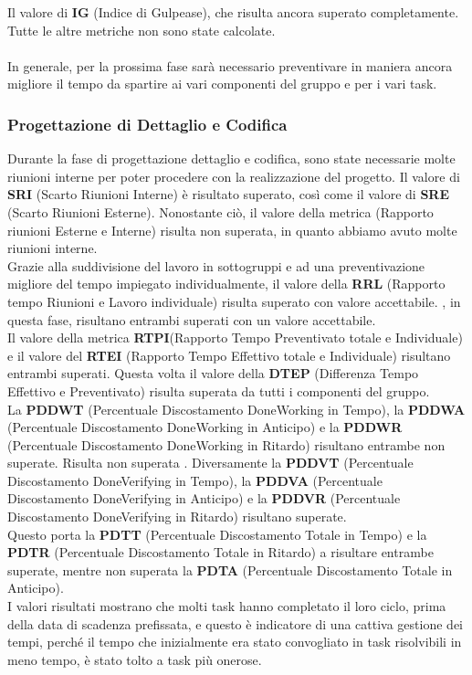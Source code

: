 Il valore di \textbf{IG} (Indice di Gulpease), che risulta ancora superato completamente.\\
Tutte le altre metriche non sono state calcolate.\\\\
In generale, per la prossima fase sarà necessario preventivare in maniera ancora migliore il tempo da spartire ai vari componenti del gruppo e per i vari task.

\subsubsection{Progettazione di Dettaglio e Codifica}
Durante la fase di progettazione dettaglio e codifica, sono state necessarie molte riunioni interne per poter procedere con la realizzazione del progetto.
Il valore di \textbf{SRI} (Scarto Riunioni Interne) è risultato superato, così come il valore di \textbf{SRE} (Scarto Riunioni Esterne). Nonostante ciò, il valore della metrica (Rapporto riunioni Esterne e Interne) risulta non superata, in quanto abbiamo avuto molte riunioni interne.\\
Grazie alla suddivisione del lavoro in sottogruppi e ad una preventivazione migliore del tempo impiegato individualmente, il valore della \textbf{RRL} (Rapporto tempo Riunioni e Lavoro individuale) risulta superato con valore accettabile. , in questa fase, risultano entrambi superati con un valore accettabile. \\
Il valore della metrica \textbf{RTPI}(Rapporto Tempo Preventivato totale e Individuale) e il valore del \textbf{RTEI} (Rapporto Tempo Effettivo totale e Individuale) risultano entrambi superati.
Questa volta il valore della \textbf{DTEP} (Differenza Tempo Effettivo e Preventivato) risulta superata da tutti i componenti del gruppo.\\
La \textbf{PDDWT} (Percentuale Discostamento DoneWorking in Tempo), la \textbf{PDDWA} (Percentuale Discostamento DoneWorking in Anticipo) e la \textbf{PDDWR} (Percentuale Discostamento DoneWorking in Ritardo) risultano entrambe non superate. Risulta non superata . Diversamente la \textbf{PDDVT} (Percentuale Discostamento DoneVerifying in Tempo), la \textbf{PDDVA} (Percentuale Discostamento DoneVerifying in Anticipo) e la \textbf{PDDVR} (Percentuale Discostamento DoneVerifying in Ritardo) risultano superate. \\ Questo porta la \textbf{PDTT} (Percentuale Discostamento Totale in Tempo) e la \textbf{PDTR} (Percentuale Discostamento Totale in Ritardo) a risultare entrambe superate, mentre non superata la \textbf{PDTA} (Percentuale Discostamento Totale in Anticipo).\\ I valori risultati mostrano che molti task hanno completato il loro ciclo, prima della data di scadenza prefissata, e questo è indicatore di una cattiva gestione dei tempi, perché il tempo che inizialmente era stato convogliato in task risolvibili in meno tempo, è stato tolto a task più onerose.\\
